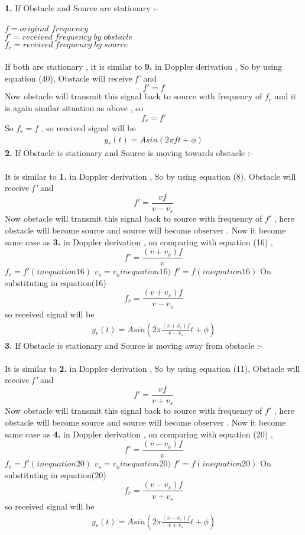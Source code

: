 \documentclass[journal,12pt,twocolumn]{IEEEtran}
\theoremstyle{remark}
\begin{document}
\textbf{1.} If Obstacle and Source are stationary :-\\\\
 $f=original\; frequency$\\
 $f'=received \; frequency\;by\;obstacle$\\
 $f_r=received \; frequency\;by\;source$\\\\
 If both are stationary , it is similar to\textbf{ 9.} in Doppler derivation , So by using equation (40), Obstacle will receive \textit{f'} and 
 $$f'=f$$
 Now obstacle will transmit this signal back to source with frequency of $f_r$ and it is again similar situation as above , so  $$f_r=f'$$
 So $f_r=f$ , so received signal will be
 \begin{align}y_r(t) = Asin( 2 \pi ft + \phi )\end{align}
 \textbf{2.} If Obstacle is stationary and  Source is moving towards obstacle :-\\\\
 It is similar to\textbf{ 1.} in Doppler derivation , So by using equation (8), Obstacle will receive \textit{f'} and 
 $$f' = \frac{v f}{v- v_s }$$
 Now obstacle will transmit this signal back to source with frequency of $f'$ , here obstacle will become source and source will become observer . Now it become same case as \textbf{3.} in Doppler derivation , on comparing with equation (16) ,
 $$f' = \frac{(v+v_o) f}{v }$$
 $f_r=f'(in equation 16)$
 $v_s=v_oin equation 16)$
 $f'=f(in equation 16)$
 On substituting in equation(16)
 $$f_r = \frac{(v+v_s) f}{v- v_s }$$
  so received signal will be
 \begin{align}y_r(t) = Asin( 2 \pi  \frac{(v+v_s) f}{v- v_s }t + \phi )\end{align}
 \textbf{3.} If Obstacle is stationary and  Source is moving away from obstacle :-\\\\
 It is similar to\textbf{ 2.} in Doppler derivation , So by using equation (11), Obstacle will receive \textit{f'} and 
 $$f' = \frac{v f}{v+ v_s }$$
 Now obstacle will transmit this signal back to source with frequency of $f'$ , here obstacle will become source and source will become observer . Now it become same case as \textbf{4.} in Doppler derivation , on comparing with equation (20) ,
 $$f' = \frac{(v-v_o) f}{v }$$
 $f_r=f'(in equation 20)$
 $v_s=v_oin equation 20)$
 $f'=f(in equation 20)$
 On substituting in equation(20)
 $$f_r = \frac{(v-v_s) f}{v+ v_s }$$
  so received signal will be
 \begin{align}y_r(t) = Asin( 2 \pi  \frac{(v-v_s) f}{v+ v_s }t + \phi )\end{align}
\end{document}
